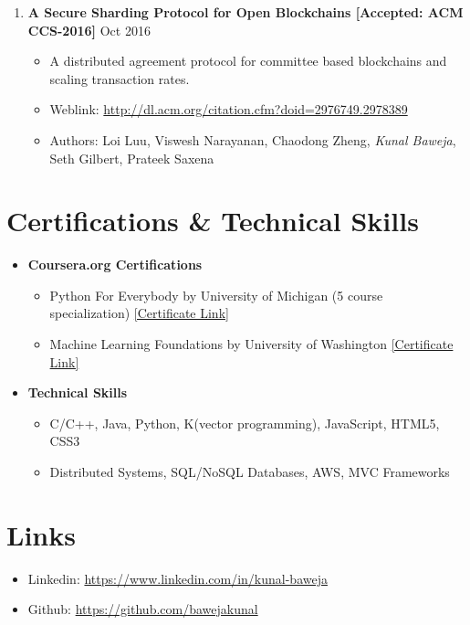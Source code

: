 \documentclass{article}
\newcommand{\bi}{\vspace{-1mm}\begin{itemize}[align=left,leftmargin=*, rightmargin=80pt, labelindent=0pt,labelsep=2pt, label={-}, nosep]}
\newcommand{\ei}{\end{itemize}}
\begin{document}
\begin{enumerate}

    \item \textbf{A Secure Sharding Protocol for Open Blockchains [Accepted: ACM CCS-2016]} {\hfill Oct 2016}
    \bi

        \item A distributed agreement protocol for committee based blockchains and scaling transaction rates.

        \item Weblink: \href{http://dl.acm.org/citation.cfm?doid=2976749.2978389}{http://dl.acm.org/citation.cfm?doid=2976749.2978389}
        
        \item Authors: Loi Luu, Viswesh Narayanan, Chaodong Zheng, \textit{Kunal Baweja}, Seth Gilbert, Prateek Saxena
    \ei

\end{enumerate}

\vspace{-2mm}
\section*{Certifications \& Technical Skills}
\begin{itemize}
    \item \textbf{Coursera.org Certifications}
    \bi
        \item Python For Everybody by University of Michigan (5 course specialization) \href{https://www.coursera.org/account/accomplishments/specialization/2B5PCJGZ9WEE}{[Certificate Link]}

        \item Machine Learning Foundations by University of Washington \href{https://www.coursera.org/account/accomplishments/certificate/NDVXWMCYKX9N}{[Certificate Link]}
    \ei

    \item \textbf{Technical Skills}
    \bi
        \item C/C++, Java, Python, K(vector programming), JavaScript, HTML5, CSS3
        \item Distributed Systems, SQL/NoSQL Databases, AWS, MVC Frameworks
    \ei
\end{itemize}

\vspace{-2mm}
\section*{Links}
\begin{itemize}[nosep]
    \item Linkedin: \href{https://www.linkedin.com/in/kunal-baweja}{https://www.linkedin.com/in/kunal-baweja}
    \item Github: \href{https://github.com/bawejakunal}{https://github.com/bawejakunal}
\end{itemize}
\end{document}
